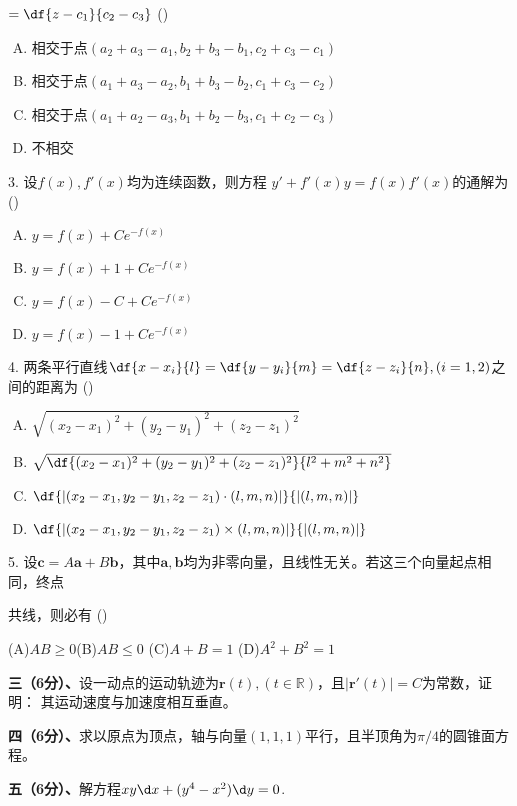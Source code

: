 	\quad\quad$=\df{z-c_1}{c_2-c_3}$
	(\underline{\quad})
	\begin{enumerate}[(A)]
      \setlength{\itemindent}{1cm}
	  \item 相交于点$(a_2+a_3-a_1,b_2+b_3-b_1,c_2+c_3-c_1)$
	  \item 相交于点$(a_1+a_3-a_2,b_1+b_3-b_2,c_1+c_3-c_2)$
	  \item 相交于点$(a_1+a_2-a_3,b_1+b_2-b_3,c_1+c_2-c_3)$
	  \item 不相交
	\end{enumerate}

3. 设$f(x),f'(x)$均为连续函数，则方程
	$y'+f'(x)y=f(x)f'(x)$的通解为
	(\underline{\quad})
	\begin{enumerate}[(A)]
      \setlength{\itemindent}{1cm}
	  \item $y=f(x)+Ce^{-f(x)}$
	  \item $y=f(x)+1+Ce^{-f(x)}$
	  \item $y=f(x)-C+Ce^{-f(x)}$
	  \item $y=f(x)-1+Ce^{-f(x)}$
	\end{enumerate}

4. 两条平行直线$\df{x-x_i}{l}=\df{y-y_i}{m}=\df{z-z_i}{n},(i=1,2)$之间的距离为
	(\underline{\quad})
	\begin{enumerate}[(A)]
      \setlength{\itemindent}{1cm}
	  \item $\sqrt{(x_2-x_1)^2+(y_2-y_1)^2+(z_2-z_1)^2}$
	  \item $\sqrt{\df{(x_2-x_1)^2+(y_2-y_1)^2+(z_2-z_1)^2}{l^2+m^2+n^2}}$
	  \item $\df{|(x_2-x_1,y_2-y_1,z_2-z_1)\cdot(l,m,n)|}{|(l,m,n)|}$
	  \item $\df{|(x_2-x_1,y_2-y_1,z_2-z_1)\times(l,m,n)|}{|(l,m,n)|}$
	\end{enumerate}

5. 设$\bm{c}=A\bm{a}+B\bm{b}$，其中$\bm{a},\bm{b}$均为非零向量，且线性无关。若这三个向量起点相同，终点

	共线，则必有
	(\underline{\quad})
	
	\hspace{1em}(A)\;$AB\geq 0$\quad (B)\;$AB\leq 0$ \quad (C)\;$A+B=1$\quad
	(D)\;$A^2+B^2=1$

\bigskip
{\bf 三（6分）、}设一动点的运动轨迹为$\bm{r}(t),(t\in\mathbb{R})$，且$|\bm{r}'(t)|=C$为常数，证明：
其运动速度与加速度相互垂直。

\bigskip
{\bf 四（6分）、}求以原点为顶点，轴与向量$(1,1,1)$平行，且半顶角为$\pi/4$的圆锥面方程。

\bigskip
{\bf 五（6分）、}解方程$xy\d x+(y^4-x^2)\d y=0$.

